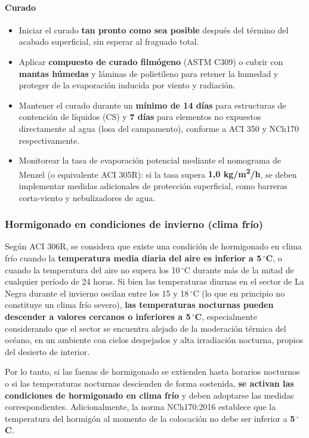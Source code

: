 \paragraph{Curado}
\begin{itemize}
    \item Iniciar el curado \textbf{tan pronto como sea posible} después del término del acabado superficial, sin esperar al fraguado total.
    \item Aplicar \textbf{compuesto de curado filmógeno} (ASTM C309) o cubrir con \textbf{mantas húmedas} y láminas de polietileno para retener la humedad y proteger de la evaporación inducida por viento y radiación.
    \item Mantener el curado durante un \textbf{mínimo de 14 días} para estructuras de contención de líquidos (CS) y \textbf{7 días} para elementos no expuestos directamente al agua (losa del campamento), conforme a ACI 350 y NCh170 respectivamente.
    \item Monitorear la tasa de evaporación potencial mediante el nomograma de Menzel (o equivalente ACI 305R): si la tasa supera \textbf{1,0 kg/m\textsuperscript{2}/h}, se deben implementar medidas adicionales de protección superficial, como barreras corta-viento y nebulizadores de agua.
\end{itemize}

\subsubsection{Hormigonado en condiciones de invierno (clima frío)}

Según ACI 306R, se considera que existe una condición de hormigonado en clima frío cuando la \textbf{temperatura media diaria del aire es inferior a 5\,$^\circ$C}, o cuando la temperatura del aire no supera los 10\,$^\circ$C durante más de la mitad de cualquier período de 24 horas. Si bien las temperaturas diurnas en el sector de La Negra durante el invierno oscilan entre los 15 y 18\,$^\circ$C (lo que en principio no constituye un clima frío severo), \textbf{las temperaturas nocturnas pueden descender a valores cercanos o inferiores a 5\,$^\circ$C}, especialmente considerando que el sector se encuentra alejado de la moderación térmica del océano, en un ambiente con cielos despejados y alta irradiación nocturna, propios del desierto de interior.

Por lo tanto, si las faenas de hormigonado se extienden hasta horarios nocturnos o si las temperaturas nocturnas descienden de forma sostenida, \textbf{se activan las condiciones de hormigonado en clima frío} y deben adoptarse las medidas correspondientes. Adicionalmente, la norma NCh170:2016 establece que la temperatura del hormigón al momento de la colocación no debe ser inferior a \textbf{5\,$^\circ$C}.


